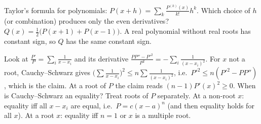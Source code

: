 \documentclass[11pt,a4paper]{article}
\begin{document}
 Taylor's formula for polynomials: $P(x+h)=\sum_k\frac{P^{(k)}(x)}{k!}h^k$. Which choice of $h$ (or combination) produces only the even derivatives?
 $Q(x)=\frac12\bigl(P(x+1)+P(x-1)\bigr)$. A real polynomial without real roots has constant sign, so $Q$ has the same constant sign.

 Look at $\frac{P'}{P}=\sum_i\frac{1}{x-x_i}$ and its derivative $\frac{PP''-P'^2}{P^2}=-\sum_i\frac{1}{(x-x_i)^2}$.
 For $x$ not a root, Cauchy--Schwarz gives $\bigl(\sum\frac1{x-x_i}\bigr)^2\le n\sum\frac1{(x-x_i)^2}$, i.e.\ $P'^2\le n(P'^2-PP'')$, which is the claim. At a root of $P$ the claim reads $(n-1)P'(x)^2\ge0$.
 When is Cauchy--Schwarz an equality? Treat roots of $P$ separately.
 At a non-root $x$: equality iff all $x-x_i$ are equal, i.e.\ $P=c(x-a)^n$ (and then equality holds for all $x$). At a root $x$: equality iff $n=1$ or $x$ is a multiple root.
\end{document}
